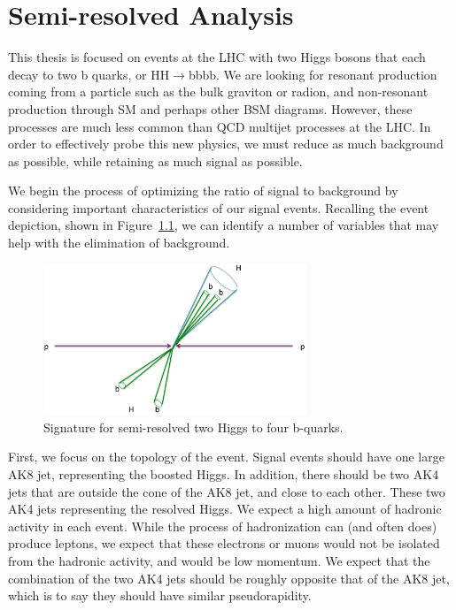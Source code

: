 \chapter{Semi-resolved Analysis}\label{Sec:Ana}

This thesis is focused on events at the LHC with two Higgs bosons that each decay to two b quarks, or HH$\rightarrow$bbbb. We are looking for resonant production coming from a particle such as the bulk graviton or radion, and non-resonant production through SM and perhaps other BSM diagrams. However, these processes are much less common than QCD multijet processes at the LHC. In order to effectively probe this new physics, we must reduce as much background as possible, while retaining as much signal as possible.

We begin the process of optimizing the ratio of signal to background by considering important characteristics of our signal events. Recalling the event depiction, shown in Figure~\ref{Fig:threecases2again}, we can identify a number of variables that may help with the elimination of background.
\begin{figure}[h!]
    \centering
        \includegraphics[width=0.7\textwidth]{F4/semiresolved.png}
        \caption{Signature for semi-resolved two Higgs to four b-quarks.}
        \label{Fig:threecases2again}
\end{figure}
First, we focus on the topology of the event. Signal events should have one large AK8 jet, representing the boosted Higgs. In addition, there should be two AK4 jets that are outside the cone of the AK8 jet, and close to each other. These two AK4 jets representing the resolved Higgs. We expect a high amount of hadronic activity in each event. While the process of hadronization can (and often does) produce leptons, we expect that these electrons or muons would not be isolated from the hadronic activity, and would be low momentum. We expect that the combination of the two AK4 jets should be roughly opposite that of the AK8 jet, which is to say they should have similar pseudorapidity. 


